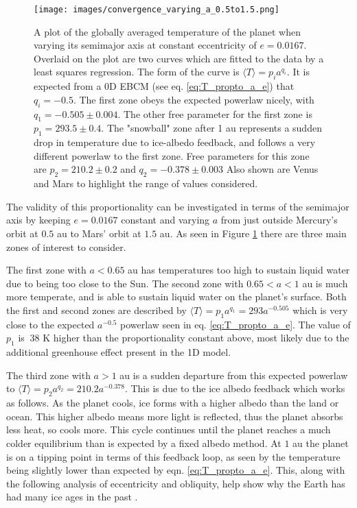 \documentclass[12pt, onecolumn]{revtex4-2}    %
\begin{document}
\begin{figure}
  \texttt{[image: images/convergence\_varying\_a\_0.5to1.5.png]}
  \caption{
    A plot of the globally averaged temperature of the planet when varying its semimajor axis at constant eccentricity of $e=0.0167$.
    Overlaid on the plot are two curves which are fitted to the data by a least squares regression.
    The form of the curve is $\langle T \rangle = p_i a^{q_i}$.
    It is expected from a 0D EBCM (see eq. \eqref{eq:T_propto_a_e}) that $q_i = -0.5$.
    The first zone obeys the expected powerlaw nicely, with $q_1 = -0.505 \pm 0.004$.
    The other free parameter for the first zone is $p_1 = 293.5 \pm 0.4$.
    The "snowball" zone after 1 au represents a sudden drop in temperature due to ice-albedo feedback, and follows a very different powerlaw to the first zone.
    Free parameters for this zone are $p_2 = 210.2 \pm 0.2$ and $q_2 = -0.378 \pm 0.003$
    Also shown are Venus and Mars to highlight the range of values considered.
  }
  \label{fig:planet_semimajoraxis}
\end{figure}
The validity of this proportionality can be investigated in terms of the semimajor axis by keeping $e = 0.0167$ constant and varying $a$ from just outside Mercury's orbit at $0.5$ au to Mars' orbit at $1.5$ au.
As seen in Figure \ref{fig:planet_semimajoraxis} there are three main zones of interest to consider.

The first zone with $a < 0.65$ au has temperatures too high to sustain liquid water due to being too close to the Sun.
The second zone with $0.65 < a < 1$ au is much more temperate, and is able to sustain liquid water on the planet's surface.
Both the first and second zones are described by $\langle T \rangle = p_1 a^{q_1} = 293 a^{-0.505}$ which is very close to the expected $a^{-0.5}$ powerlaw seen in eq. \eqref{eq:T_propto_a_e}.
The value of $p_1$ is $~38$ K higher than the proportionality constant above, most likely due to the additional greenhouse effect present in the 1D model.

The third zone with $a > 1$ au is a sudden departure from this expected powerlaw to $\langle T \rangle = p_2 a^{q_2} = 210.2 a^{-0.378}$.
This is due to the ice albedo feedback which works as follows.
As the planet cools, ice forms with a higher albedo than the land or ocean.
This higher albedo means more light is reflected, thus the planet absorbs less heat, so cools more.
This cycle continues until the planet reaches a much colder equilibrium than is expected by a fixed albedo method.
At $1$ au the planet is on a tipping point in terms of this feedback loop, as seen by the temperature being slightly lower than expected by eqn. \eqref{eq:T_propto_a_e}.
This, along with the following analysis of eccentricity and obliquity, help show why the Earth has had many ice ages in the past \cite{Emiliani78}.
\end{document}
